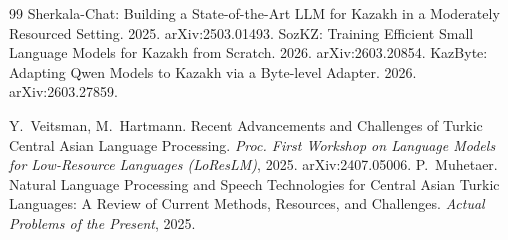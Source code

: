 \documentclass{article}
\begin{document}
\begin{thebibliography}{99}
 Sherkala-Chat: Building a State-of-the-Art LLM for Kazakh in a Moderately Resourced Setting. 2025. arXiv:2503.01493.
 SozKZ: Training Efficient Small Language Models for Kazakh from Scratch. 2026. arXiv:2603.20854.
 KazByte: Adapting Qwen Models to Kazakh via a Byte-level Adapter. 2026. arXiv:2603.27859.

 Y.~Veitsman, M.~Hartmann. Recent Advancements and Challenges of Turkic Central Asian Language Processing. \emph{Proc. First Workshop on Language Models for Low-Resource Languages (LoResLM)}, 2025. arXiv:2407.05006.
 P.~Muhetaer. Natural Language Processing and Speech Technologies for Central Asian Turkic Languages: A Review of Current Methods, Resources, and Challenges. \emph{Actual Problems of the Present}, 2025.

\end{thebibliography}
\end{document}
